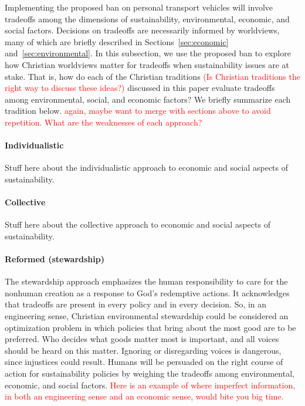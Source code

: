 \documentclass[12pt]{article}
\newcommand{\ins}[1]{\textcolor{red}{#1}}
\begin{document}
Implementing the proposed ban on personal transport vehicles
will involve tradeoffs among the dimensions of sustainability, 
environmental, economic, and social factors.
Decisions on tradeoffs are necessarily informed by worldviews,
many of which are briefly described 
in Sections~\ref{sec:economic} and~\ref{sec:environmental}.
In this subsection, 
we use the proposed ban to explore how Christian worldviews matter 
for tradeoffs when sustainability issues are at stake.
That is, how do each of the Christian traditions 
\ins{(Is Christian traditions the right way to discuss these ideas?)} 
discussed in this paper 
evaluate tradeoffs among environmental, social, and economic factors?
We briefly summarize each tradition below.
\ins{again, maybe want to merge with sections above to avoid repetition. What are the weaknesses of each approach?}

\paragraph{Individualistic} 
\label{sec:example_individualistic}

Stuff here about the individualistic approach to economic and social aspects of sustainability.


\paragraph{Collective} 
\label{sec:example_collective}

Stuff here about the collective approach to economic and social aspects of sustainability.


\paragraph{Reformed (stewardship)} 

The stewardship approach emphasizes the human responsibility 
to care for the nonhuman creation
as a response to God's redemptive actions.
It acknowledges that tradeoffs 
are present in every policy and in every decision. 
So, in an engineering sense, 
Christian environmental stewardship could be considered an optimization problem
in which policies that bring about the most good 
are to be preferred.
Who decides what goods matter most is important, and 
all voices should be heard on this matter.
Ignoring or disregarding voices is dangerous,
since injustices could result. %
Humans will be persuaded on the right course of action
for sustainability policies by weighing the tradeoffs 
among environmental, economic, and social factors.
\ins{Here is an example of where imperfect information, in both an engineering sense and an economic sense, would bite you big time.}
\end{document}
